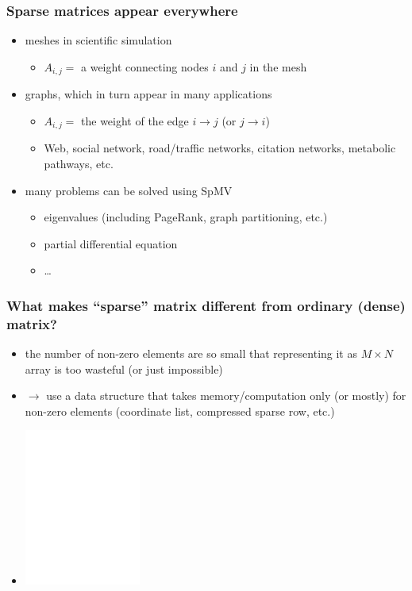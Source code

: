 \documentclass[12pt,dvipdfmx]{beamer}
\newcommand{\ao}[1]{{\color{blue}#1}}
\begin{document}
\begin{frame}
  \frametitle{Sparse matrices appear everywhere}
  \begin{itemize}
  \item \ao{meshes} in scientific simulation
    \begin{itemize}
    \item $A_{i,j} = $ a weight connecting nodes $i$ and $j$ in the mesh
    \end{itemize}

  \item \ao{graphs}, which in turn appear in many applications
    \begin{itemize}
    \item $A_{i,j} = $ the weight of the edge $i \rightarrow j$ (or $j \rightarrow i$)
    \item Web, social network, road/traffic networks,
      citation networks, metabolic pathways, etc.
    \end{itemize}
    
  \item many problems can be solved using SpMV
    \begin{itemize}
    \item eigenvalues (including PageRank, graph partitioning, etc.)
    \item partial differential equation
    \item \ldots
    \end{itemize}
  \end{itemize}
\end{frame}

\begin{frame}
  \frametitle{What makes ``sparse''
    matrix different from ordinary (dense) matrix?}

  \begin{itemize}
  \item the number of non-zero elements are so small that
    representing it as $M \times N$ array is too wasteful
    (or just impossible)
  \item $\rightarrow$ use a data structure that takes memory/computation
    only (or mostly) for non-zero elements
    \ao{(coordinate list, compressed sparse row, etc.)}
  \item []
      \begin{center}
        \includegraphics[width=0.3\textwidth]{out/pdf/svg/spmv.pdf}
      \end{center}
  \end{itemize}

\end{frame}
\end{document}
